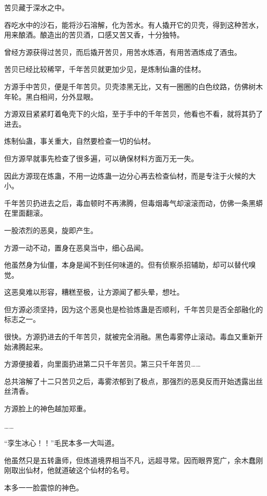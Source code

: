 
\begin{this_body}

苦贝藏于深水之中。

吞吃水中的沙石，能将沙石溶解，化为苦水。有人撬开它的贝壳，得到这种苦水，用来酿酒。酿造出的苦贝酒，口感又苦又香，十分独特。

曾经方源获得过苦贝，而后撬开苦贝，用苦水炼酒，有用苦酒炼成了酒虫。

苦贝已经比较稀罕，千年苦贝就更加少见，是炼制仙蛊的佳材。

方源手中苦贝，便是千年苦贝。贝壳漆黑无比，又有一圈圈的白色纹路，仿佛树木年轮。黑白相间，分外显眼。

方源双目紧紧盯着龟壳下的火焰，至于手中的千年苦贝，他看也不看，就将其扔了进去。

炼制仙蛊，事关重大，自然要检查一切的仙材。

但方源早就事先检查了很多遍，可以确保材料方面万无一失。

因此方源现在炼蛊，不用一边炼蛊一边分心再去检查仙材，而是专注于火候的大小。

千年苦贝扔进去之后，毒血顿时不再沸腾，但毒烟毒气却滚滚而动，仿佛一条黑蟒在里面翻滚。

一股浓烈的恶臭，旋即产生。

方源一动不动，置身在恶臭当中，细心品闻。

他虽然身为仙僵，本身是闻不到任何味道的。但有侦察杀招辅助，却可以替代嗅觉。

这恶臭难以形容，糟糕至极，让方源闻了都头晕，想吐。

但方源必须坚持，因为这个恶臭也是检验炼蛊是否顺利，千年苦贝是否全部融化的标志之一。

很快。方源扔进去的千年苦贝，就被完全消融。黑色毒雾停止滚动。毒血又重新开始沸腾起来。

方源便接着，向里面扔进第二只千年苦贝。第三只千年苦贝……

总共溶解了十二只苦贝之后，毒雾浓郁到了极点，那强烈的恶臭反而开始透露出丝丝清香。

方源脸上的神色越加郑重。

……

“孪生冰心！！”毛民本多一大叫道。

他虽然只是五转蛊师，但炼道境界相当不凡，远超寻常。因而眼界宽广，余木蠢刚刚取出仙材，他就道破这个仙材的名号。

本多一一脸震惊的神色。


\end{this_body}
